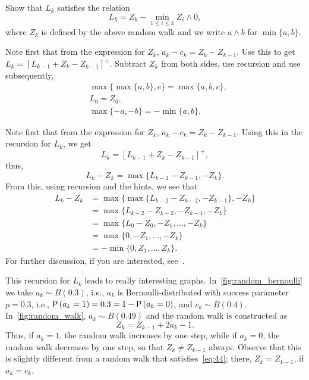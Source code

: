 \begin{exercise}
Show that  $L_k$ satisfies the relation
\begin{equation}\label{eq:reich1}
  L_k = Z_k - \min_{1\leq i \leq k} Z_i\wedge 0,
\end{equation}
where $Z_k$ is defined by the above random walk and
we write $a\wedge b$ for $\min\{a,b\}$.
\begin{hint}
Note first that from the expression for $Z_k$,
  $a_k - c_k = Z_k - Z_{k-1}$. Use this to get
  $L_k = [L_{k-1} +Z_k- Z_{k-1}]^+$. Subtract $Z_k$ from both sides, use recursion and
  use subsequently,
\begin{align*}
&\max\{\max\{a,b\}, c\} = \max\{a,b,c\}, \\
&L_0 = Z_0, \\
&\max\{-a, -b \} = -\min\{a,b\}.
\end{align*}
\end{hint}
\begin{solution}
Note first that from the expression
for $Z_k$, $a_k - c_k = Z_k - Z_{k-1}$. Using this in the recursion
for $L_k$, we get
\begin{equation*}
  L_k = [L_{k-1} +Z_k- Z_{k-1}]^+,
\end{equation*}
thus, 
\begin{equation*}
  L_k - Z_{k} = \max\{L_{k-1} - Z_{k-1}, -Z_k\}.
\end{equation*}
From this, using recursion and the hints, we see that
\begin{equation*}
  \begin{split}
  L_k - Z_{k} 
&= \max\{\max\{L_{k-2} - Z_{k-2}, -Z_{k-1}\}, -Z_k\} \\
&= \max\{L_{k-2} - Z_{k-2}, -Z_{k-1}, -Z_k\} \\
&= \max\{L_{0} - Z_{0}, -Z_1, \ldots, -Z_k\} \\
&= \max\{0, -Z_1, \ldots, -Z_k\} \\
&= - \min\{0, Z_1, \ldots, Z_k\}.
  \end{split}
  \end{equation*}
  For further discussion, if you are interested, see~\citet{baccelli88:_sampl_m_m}.
\end{solution}
\end{exercise}

This recursion for $L_k$ leads to really interesting graphs.
In~\cref{fig:random_bernoulli} we take $a_k \sim B(0.3)$, i.e., $a_k$ is Bernoulli-distributed with success parameter $p=0.3$, i.e., $\P{a_k = 1} = 0.3 = 1- \P{a_k=0}$, and $c_k \sim B(0.4)$.
In~\cref{fig:random_walk}, $a_k\sim B(0.49)$ and the random walk is constructed as
\begin{equation}\label{eq:51}
  Z_k = Z_{k-1} + 2 a_k -1.
\end{equation}
Thus, if $a_k=1$, the random walk increases by one step, while if $a_k=0$, the random walk decreases by one step, so that $Z_k \neq Z_{k-1}$  always. Observe that this is slightly different from a random walk that satisfies~\cref{eq:44}; there, $Z_{k}=Z_{k-1}$, if $a_k=c_k$.


